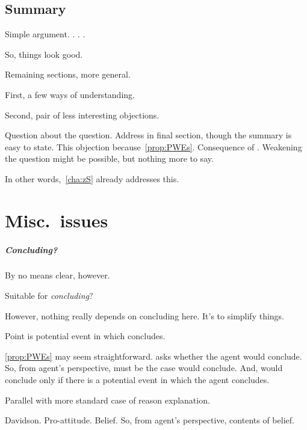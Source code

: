 \subsection{Summary}
\label{sec:summary}

\begin{note}
  Simple argument.
  \ptivity{}.
  .
  \ptivity{}.

  So, things look good.
\end{note}

\begin{note}
  Remaining sections, more general.

  First, a few ways of understanding.

  Second, pair of less interesting objections.
\end{note}

\begin{note}
  Question about the question.
  Address in final section, though the summary is easy to state.
  This objection because~\autoref{prop:PWEs}.
  Consequence of \qzS{}.
  Weakening the question might be possible, but nothing more to say.

  In other words,~\autoref{cha:zS} already addresses this.
\end{note}


\newpage

\section{Misc.\ issues}
\label{cha:zSpA:sec:misc-issues}

\subparagraph{Concluding?}

\begin{note}
  By no means clear, however.

  Suitable for \emph{concluding}?
\end{note}

\begin{note}
  However, nothing really depends on concluding here.
  It's to simplify things.
\end{note}


\newpage

\begin{note}
  \color{blue}
  Point is potential event in which concludes.

  \autoref{prop:PWEs} may seem straightforward.
  \qzS{} asks whether the agent would conclude.
  So, from agent's perspective, must be the case would conclude.
  And, would conclude only if there is a potential event in which the agent concludes.

  Parallel with more standard case of reason explanation.

  Davidson.
  Pro-attitude.
  Belief.
  So, from agent's perspective, contents of belief.
\end{note}

